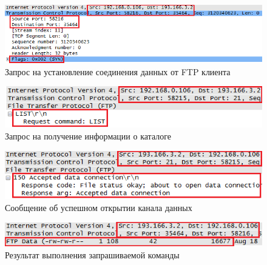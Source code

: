 \documentclass[14pt,a4paper,report]{report}
\begin{document}
\clearpage

\begin{figure}[h!]
	\centering
	\includegraphics[scale = 0.75]{images/ftp18.png}
	
	\caption{Запрос на установление соединения данных от FTP клиента}
	\label{image:24}
\end{figure}


\begin{figure}[h!]
	\centering
	\includegraphics[scale = 0.75]{images/ftp19.png}
	
	\caption{Запрос на получение информации о каталоге}
	\label{image:23}
\end{figure}



\begin{figure}[h!]
	\centering
	\includegraphics[scale = 0.75]{images/ftp20.png}
	
	\caption{Сообщение об успешном открытии канала данных}
	\label{image:25}
\end{figure}

\begin{figure}[h!]
	\centering
	\includegraphics[scale = 0.75]{images/ftp21.png}
	
	\caption{Результат выполнения запрашиваемой команды}
	\label{image:26}
\end{figure}
\end{document}
